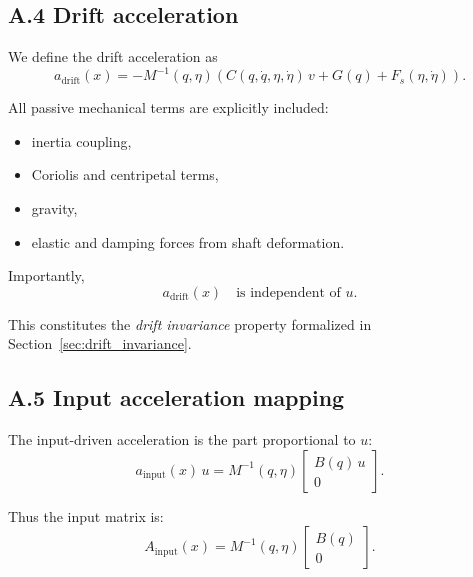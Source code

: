 \documentclass[12pt]{article}
\begin{document}
\subsection{A.4 \quad Drift acceleration}

We define the drift acceleration as
\begin{equation}
  a_{\mathrm{drift}}(x)
  =
  -M^{-1}(q,\eta)
  \left(
    C(q,\dot{q},\eta,\dot{\eta})\,v
    + G(q)
    + F_{s}(\eta,\dot{\eta})
  \right).
  \label{eq:appendix_drift_def}
\end{equation}

All passive mechanical terms are explicitly included:
\begin{itemize}
  \item inertia coupling,
  \item Coriolis and centripetal terms,
  \item gravity,
  \item elastic and damping forces from shaft deformation.
\end{itemize}

Importantly,
\[
  a_{\mathrm{drift}}(x) \quad \text{is independent of } u.
\]

This constitutes the \emph{drift invariance} property formalized in Section~\ref{sec:drift_invariance}.

\subsection{A.5 \quad Input acceleration mapping}

The input-driven acceleration is the part proportional to \(u\):
\begin{equation}
  a_{\mathrm{input}}(x)\,u
  =
  M^{-1}(q,\eta)
  \begin{bmatrix}
    B(q)\,u \\ 0
  \end{bmatrix}.
\end{equation}

Thus the input matrix is:
\begin{equation}
  A_{\mathrm{input}}(x)
  =
  M^{-1}(q,\eta)
  \begin{bmatrix}
    B(q) \\ 0
  \end{bmatrix}.
  \label{eq:appendix_Ainput}
\end{equation}
\end{document}

